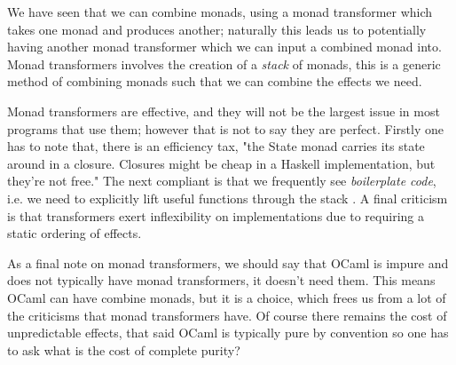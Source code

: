 We have seen that we can combine monads,
using a monad transformer which takes one monad
and produces another;
naturally this leads us to potentially
having another monad transformer which we can input
a combined monad into.
Monad transformers involves
the creation of a \textit{stack} of monads,
this is a generic method of combining monads
such that we can combine the effects we need.

Monad transformers are effective,
and they will not be the largest issue in most programs
that use them;
however that is not to say they are perfect.
Firstly one has to note that, there is an efficiency tax,
"the State monad carries its state around in a closure.
Closures might be cheap in a Haskell implementation, but they're not free."
\cite{o2008real}
The next compliant is that we frequently see \textit{boilerplate code},
i.e. we need to explicitly lift useful functions through the stack
\cite{kammar2013handlers}.
A final criticism is that transformers exert inflexibility on implementations
due to requiring a static ordering of effects.

As a final note on monad transformers,
we should say that OCaml is impure and does not typically have monad transformers,
it doesn't need them.
This means OCaml can have combine monads, but it is a choice,
which frees us from a lot of the criticisms that monad transformers have.
Of course there remains the cost of unpredictable effects,
that said OCaml is typically pure by convention so one has to ask
what is the cost of complete purity?

